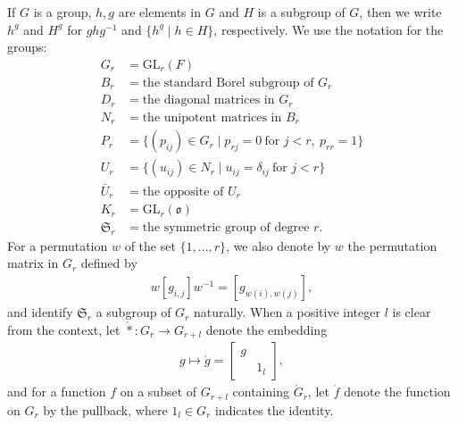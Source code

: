\documentclass[11pt]{amsart}
\newcommand\oo{\mathfrak{o}}
\newcommand\Sf{{\mathfrak{S}}}
\newcommand\1{\mathbf{1}}
\newcommand\ac{\acute}
\newcommand\GL{{\mathrm{GL}}}
\numberwithin{equation}{section}
\begin{document}
If $G$ is a group, $h,g$ are elements in $G$ and $H$ is a subgroup of $G$, then we write $h^g$ and $H^g$ for $g h g^{-1}$ and $\{h^g \mid h \in H \}$, respectively.
We use the notation for the groups: 
\begin{align*}
G_r &= \GL_r(F) \\
B_r & = \mbox{the standard Borel subgroup of $G_r$}\\
D_r &= \mbox{the diagonal matrices in $G_r$} \\
N_r &= \mbox{the unipotent matrices in $B_r$} \\
P_r &= \{(p_{ij}) \in G_r \mid p_{rj} = 0 \ \mbox{for $j < r$}, \ p_{rr} = 1 \} \\
U_r &= \{(u_{ij}) \in N_r \mid u_{ij} = \delta_{ij} \ \mbox{for $j <r$} \} \\
\bar{U}_r & = \mbox{the opposite of $U_r$} \\
K_r&= \GL_r(\oo) \\
\Sf_r & = \mbox{the symmetric group of degree $r$}.
\end{align*}  
For a permutation $w$ of the set $\{1, \ldots, r\}$, we also denote by $w$ the permutation matrix in $G_r$ defined by 
\begin{align*}
w[g_{i,j}]w^{-1} = [g_{w(i),w(j)}],
\end{align*} 
and identify $\Sf_r$ a subgroup of $G_r$ naturally.
When a positive integer $l$ is clear from the context, let $\acute{*}: G_r \to G_{r+l}$ denote the embedding 
\begin{align*}
g \longmapsto \ac{g} = \begin{bmatrix}
g &  \\
& 1_{l}
\end{bmatrix},
\end{align*} 
and for a function $f$ on a subset of $G_{r+l}$ containing $\ac{G}_r$, let $\ac{f}$ denote the function on $G_r$ by the pullback, where $1_{l} \in G_r$ indicates the identity.
\end{document}

